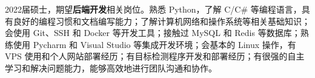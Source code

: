 {\onehalfspacing\hspace{2em}%
2022届硕士，期望\textbf{后端开发}相关岗位。熟悉 Python，了解 C/C\# 等编程语言，具有良好的编程习惯和文档编写能力；了解计算机网络和操作系统等相关基础知识；会使用 Git、SSH 和 Docker 等开发工具；接触过 MySQL 和 Redis 等数据库；熟练使用 Pycharm 和 Visual Studio 等集成开发环境；会基本的 Linux 操作，有 VPS 使用和个人网站部署经历；有目标检测程序开发和部署经历；有很强的自主学习和解决问题能力，能够高效地进行团队沟通和协作。
\par}
